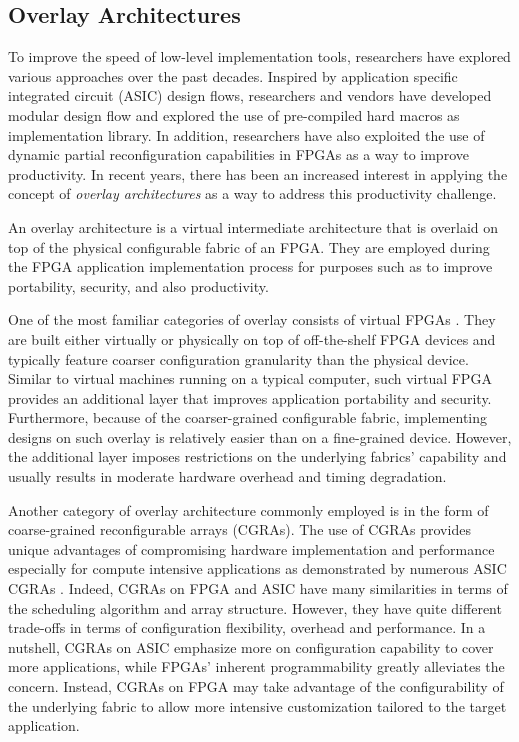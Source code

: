 \subsection{Overlay Architectures}
To improve the speed of low-level implementation tools, researchers have explored various approaches over the past decades.
Inspired by application specific integrated circuit (ASIC) design flows, researchers and vendors have developed modular design flow and explored the use of pre-compiled hard macros \cite{lavin2010using,lavin2011} as implementation library.
In addition, researchers have also exploited the use of dynamic partial reconfiguration capabilities in FPGAs \cite{Frangieh2010} as a way to improve productivity.
In recent years, there has been an increased interest in applying the concept of \emph{overlay architectures} as a way to address this productivity challenge.  


An overlay architecture is a virtual intermediate architecture that is overlaid on top of the physical configurable fabric of an FPGA.  They are employed during the FPGA application implementation process for purposes such as to improve portability, security, and also productivity.

One of the most familiar categories of overlay consists of virtual FPGAs \cite{zuma2013carl,Grant2011Malibu,Coole2010Intermediate,Koch2013CI}. They are built either virtually or physically on top of off-the-shelf FPGA devices and typically feature coarser configuration granularity than the physical device.
Similar to virtual machines running on a typical computer, such virtual FPGA provides an additional layer that improves application portability and security.
Furthermore, because of the coarser-grained configurable fabric, implementing designs on such overlay is relatively easier than on a fine-grained device.
However, the additional layer imposes restrictions on the underlying fabrics' capability and usually results in moderate hardware overhead and timing degradation.

Another category of overlay architecture commonly employed is in the form of coarse-grained reconfigurable arrays (CGRAs).
The use of CGRAs provides unique advantages of compromising hardware implementation and performance especially for compute intensive applications as demonstrated by numerous ASIC CGRAs \cite{tessier2001reconfigurable} \cite{compton2002reconfigurable}.
Indeed, CGRAs on FPGA and ASIC have many similarities in terms of the scheduling algorithm and array structure.
However, they have quite different trade-offs in terms of configuration flexibility, overhead and performance.
In a nutshell, CGRAs on ASIC emphasize more on configuration capability to cover more applications, while FPGAs' inherent programmability greatly alleviates the concern.
Instead, CGRAs on FPGA may take advantage of the configurability of the underlying fabric to allow more intensive customization tailored to the target application.

